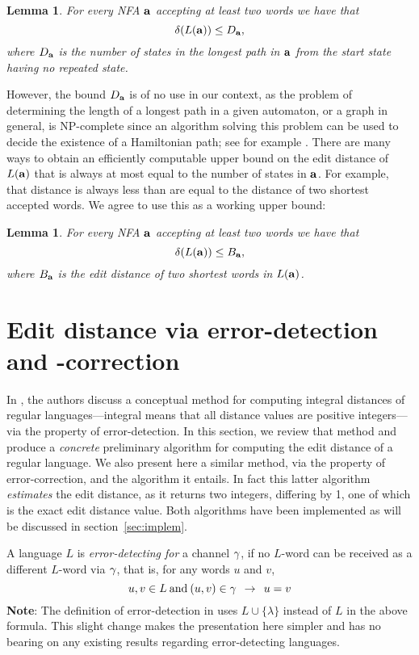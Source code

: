 \documentclass{article}
\theoremstyle{plain}
\newtheorem{lemma}[theorem]{Lemma}
\theoremstyle{definition}
\theoremstyle{remark}
\newcommand{\e}{\lambda}
\newcommand\db{B}             \newcommand\dbold{D}   \newcommand\pssi{\par\smallskip\indent}
\begin{document}
\begin{lemma}
For every NFA $\mathbf{a}$ accepting at least two words
we have that $$\dist(L(\aut))\le \dbold_\aut,$$
where $\dbold_\aut$ is the number of states in the
longest path in $\mathbf{a}$ from the start state having no repeated state.
\end{lemma}

However, the bound $\dbold_\aut$ is of no use in our context,
as the problem of determining the length of a longest path in a given automaton, or a graph in general, is NP-complete since an algorithm solving this problem can be used to decide the existence of a Hamiltonian path; see for example \cite{Schr:2003}.
There are many ways to obtain an efficiently computable
upper bound on the edit distance of $L(\mathbf{a})$ that is always
at most equal to the number of states in $\mathbf{a}$.
For example, that distance is always less than are equal
to the distance of  two shortest accepted words.
We agree to use this as a working upper bound:


\begin{lemma}\label{lem:bound}
For every NFA $\mathbf{a}$ accepting at least two words
we have that $$\dist(L(\aut))\le \db_\aut,$$
where $\db_\aut$ is the edit distance of two
shortest words in $L(\mathbf{a})$.
\end{lemma}


\section{Edit distance via error-detection and -correction}\label{sec:ed}
In \cite{KonSil:2010}, the authors discuss a
conceptual method for computing integral distances of regular languages---integral means that all distance values are positive integers---via
the property of error-detection.
In this section, we review that method and produce
a \emph{concrete} preliminary algorithm for computing
the edit distance of a regular language.
We also present here a similar method, via the property of error-correction, and the algorithm it entails. In fact this
latter algorithm \emph{estimates} the edit distance, as it returns two integers, differing by 1, one of which is the exact edit distance value.
Both algorithms have been implemented as
will be discussed
in section~\ref{sec:implem}.

A language $L$ is \emph{error-detecting for} a channel $\gamma$, if no $L$-word can be received as a different $L$-word via $\gamma$, that is,
for any words $u$ and $v$,
\[
u,v\in L\>\hbox{and}\> (u,v)\in\gamma\>\>\rightarrow\>\> u=v
\]
\textbf{Note}: The definition of error-detection in
\cite{Kon:2002} uses $L\cup\{\e\}$ instead of $L$
in the above formula. This slight change makes the
presentation here simpler and has no bearing on any
existing results regarding error-detecting languages.
\end{document}
